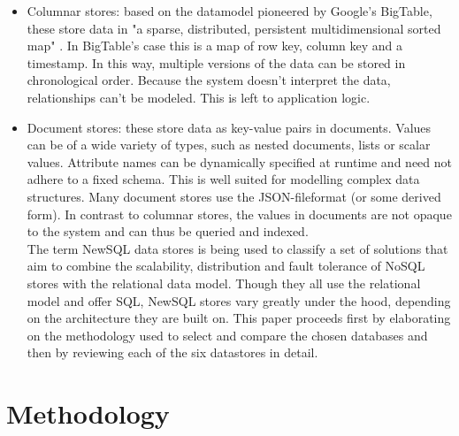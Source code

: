 \documentclass{IEEEtran}
\begin{document}
\begin{itemize}
\item Columnar stores: based on the datamodel pioneered by Google's BigTable, these store data in "a sparse, distributed, persistent multidimensional sorted map" \cite{chang2008bigtable}. In BigTable's case this is a map of row key, column key and a timestamp. In this way, multiple versions of the data can be stored in chronological order. Because the system doesn't interpret the data, relationships can't be modeled. This is left to application logic\cite{hecht2011nosql}.
\item Document stores: these store data as key-value pairs in documents. Values can be of a wide variety of types, such as nested documents, lists or scalar values. Attribute names can be dynamically specified at runtime and need not adhere to a fixed schema\cite{cattell2011scalable}. This is well suited for modelling complex data structures. Many document stores use the JSON-fileformat (or some derived form). In contrast to columnar stores, the values in documents are not opaque to the system and can thus be queried and indexed\cite{hecht2011nosql}.\\
The term NewSQL data stores is being used to classify a set of solutions that aim to combine the scalability, distribution and fault tolerance of NoSQL stores with the relational data model. Though they all use the relational model and offer SQL, NewSQL stores vary greatly under the hood, depending on the architecture they are built on\cite{grolinger2013data}. This paper proceeds first by elaborating on the methodology used to select and compare the chosen databases and then by reviewing each of the six datastores in detail.
\end{itemize}




\section{Methodology}
\end{document}

